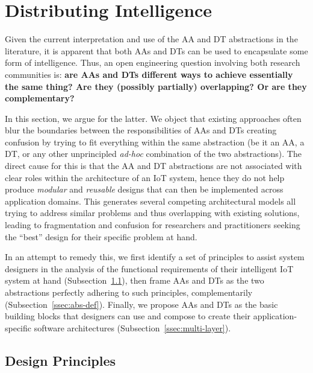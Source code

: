 \section{Distributing Intelligence}

Given the current interpretation and use of the AA and DT abstractions in the literature, it is apparent that both AAs and DTs can be used to encapsulate some form of intelligence. 
Thus, an open engineering question involving both research communities is: \textbf{are AAs and DTs different ways to achieve essentially the same thing? 
Are they (possibly partially) overlapping? 
Or are they complementary?} 

In this section, we argue for the latter. 
We object that existing approaches often blur the boundaries between the responsibilities of AAs and DTs creating confusion by trying to fit everything within the same abstraction (be it an AA, a DT, or any other unprincipled \emph{ad-hoc} combination of the two abstractions). 
%
The direct cause for this is that the AA and DT abstractions are not associated with clear roles within the architecture of an IoT system, hence they do not help produce \emph{modular} and \emph{reusable} designs that can then be implemented across application domains. 
%
This generates several competing architectural models all trying to address similar problems and thus overlapping with existing solutions, leading to fragmentation and confusion for researchers and practitioners seeking the ``best'' design for their specific problem at hand. 

In an attempt to remedy this, 
we first identify a set of principles to assist system designers in the analysis of the functional requirements of their intelligent IoT system at hand (Subsection~\ref{ssec:principles}), 
then frame AAs and DTs as the two abstractions perfectly adhering to such principles, complementarily (Subsection~\ref{ssec:abs-def}). 
Finally, we propose AAs and DTs as the basic building blocks that designers can use and compose to create their application-specific software architectures (Subsection~\ref{ssec:multi-layer}).


\subsection{Design Principles}
\label{ssec:principles}


